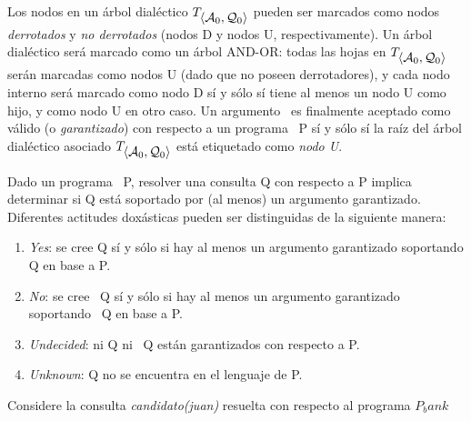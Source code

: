 Los nodos en un árbol dialéctico $T_{\mbox{$\langle \mbox{${\mathcal A_0}$},\mbox{${\mathcal Q_0}$} \rangle $}}$ pueden ser marcados como nodos \textit{derrotados} y 
\textit{no derrotados} (nodos D y nodos U, respectivamente). Un árbol dialéctico será marcado como un 
árbol AND-OR: todas las hojas en $T_{\mbox{$\langle \mbox{${\mathcal A_0}$},\mbox{${\mathcal Q_0}$} \rangle $}}$ serán marcadas como nodos U (dado que no poseen derrotadores),
y cada nodo interno será marcado como nodo D sí y sólo sí tiene al menos un nodo U como hijo, y como 
nodo U en otro caso. Un argumento \AoQo\ es finalmente aceptado como válido (o \textit{garantizado}) con 
respecto a un programa \DLP\ P sí y sólo sí la raíz del árbol dialéctico asociado $T_{\mbox{$\langle \mbox{${\mathcal A_0}$},\mbox{${\mathcal Q_0}$} \rangle $}}$ está etiquetado
como \textit{nodo U}. %

Dado un programa \DLP\ P, resolver una consulta Q con respecto a P implica determinar si Q está soportado
por (al menos) un argumento garantizado. Diferentes actitudes doxásticas %
pueden ser distinguidas de la siguiente manera:

\begin{enumerate}[(1)]
	\item \textit{Yes}: se cree Q sí y sólo si hay al menos un argumento garantizado soportando Q en base a P.
	\item \textit{No}: se cree ~Q sí y sólo si hay al menos un argumento garantizado soportando ~Q en base a P.
	\item \textit{Undecided}: ni Q ni ~Q están garantizados con respecto a P.
	\item \textit{Unknown}: Q no se encuentra en el lenguaje de P.
\end{enumerate}




\begin{ejemplo}
Considere la consulta \textit{candidato(juan)} resuelta con respecto al programa $P_bank$
\end{ejemplo}






















